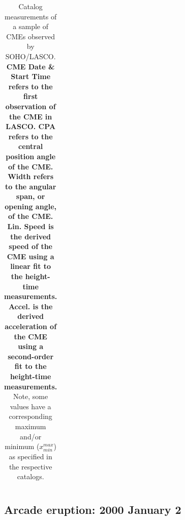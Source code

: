 \documentclass[referee,a4paper,12pt,traditabstract]{swsc}
\begin{document}
\begin{linenumbers}
\begin{table}[!t]
\begin{tabular}{l*{5}{c}r}
\end{tabular}
\caption{Catalog measurements of a sample of CMEs observed by SOHO/LASCO. {\bf CME Date \& Start Time refers to the first observation of the CME in LASCO. CPA refers to the central position angle of the CME. Width refers to the angular span, or opening angle, of the CME. Lin. Speed is the derived speed of the CME using a linear fit to the height-time measurements. Accel. is the derived acceleration of the CME using a second-order fit to the height-time measurements.} Note, some values have a corresponding maximum and/or minimum ($x_{min}^{max}$) as specified in the respective catalogs.}
\label{event_table}
\end{table}


\subsection{Arcade eruption: 2000 January 2}
\label{sect_20000102}


\end{linenumbers}
\end{document}
